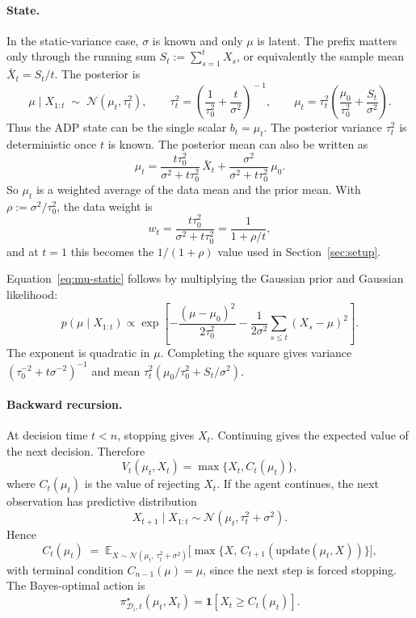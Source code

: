 \documentclass[11pt]{article}
\begin{document}
\paragraph{State.}
In the static-variance case, \(\sigma\) is known and only \(\mu\) is latent. The prefix matters only through the running sum \(S_t := \sum_{s=1}^t X_s\), or equivalently the sample mean \(\bar X_t=S_t/t\). The posterior is
\begin{equation}
\label{eq:mu-static}
\mu \mid X_{1:t} \;\sim\; \mathcal{N}(\mu_t, \tau_t^2),
\qquad
\tau_t^2 = \!\left(\frac{1}{\tau_0^2} + \frac{t}{\sigma^2}\right)^{\!-1},
\qquad
\mu_t = \tau_t^2\!\left(\frac{\mu_0}{\tau_0^2} + \frac{S_t}{\sigma^2}\right).
\end{equation}
Thus the ADP state can be the single scalar \(b_t=\mu_t\). The posterior variance \(\tau_t^2\) is deterministic once \(t\) is known. The posterior mean can also be written as
\[
\mu_t
= \frac{t\tau_0^2}{\sigma^2+t\tau_0^2}\,\bar X_t
  + \frac{\sigma^2}{\sigma^2+t\tau_0^2}\,\mu_0 .
\]
So \(\mu_t\) is a weighted average of the data mean and the prior mean. With \(\rho:=\sigma^2/\tau_0^2\), the data weight is
\[
w_t=\frac{t\tau_0^2}{\sigma^2+t\tau_0^2}
    =\frac{1}{1+\rho/t},
\]
and at \(t=1\) this becomes the \(1/(1+\rho)\) value used in Section~\ref{sec:setup}.

Equation~\eqref{eq:mu-static} follows by multiplying the Gaussian prior and Gaussian likelihood:
\[
p(\mu \mid X_{1:t})
\propto
\exp\!\left[
-\frac{(\mu-\mu_0)^2}{2\tau_0^2}
-\frac{1}{2\sigma^2}\sum_{s\le t}(X_s-\mu)^2
\right].
\]
The exponent is quadratic in \(\mu\). Completing the square gives variance \((\tau_0^{-2}+t\sigma^{-2})^{-1}\) and mean \(\tau_t^2(\mu_0/\tau_0^2+S_t/\sigma^2)\).

\paragraph{Backward recursion.}
At decision time \(t<n\), stopping gives \(X_t\). Continuing gives the expected value of the next decision. Therefore
\[
V_t(\mu_t,X_t)=\max\{X_t,C_t(\mu_t)\},
\]
where \(C_t(\mu_t)\) is the value of rejecting \(X_t\). If the agent continues, the next observation has predictive distribution
\[
X_{t+1}\mid X_{1:t}\sim \mathcal{N}(\mu_t,\tau_t^2+\sigma^2).
\]
Hence
\begin{equation}
\label{eq:Crec-static}
C_t(\mu_t) \;=\; \mathbb{E}_{X \sim \mathcal{N}(\mu_t,\, \tau_t^2 + \sigma^2)}\!\Big[\max\!\big\{X,\, C_{t+1}(\mathrm{update}(\mu_t, X))\big\}\Big],
\end{equation}
with terminal condition \(C_{n-1}(\mu)=\mu\), since the next step is forced stopping. The Bayes-optimal action is
\[
\pi^\star_{\mathcal{D}_i,t}(\mu_t,X_t)=\mathbf{1}[X_t\ge C_t(\mu_t)] .
\]
\end{document}
